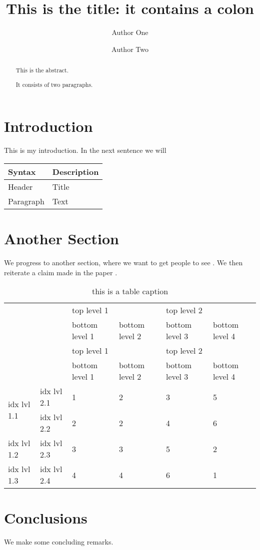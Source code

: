\documentclass[
]{article}
\title{This is the title: it contains a colon}
\author{Author One \and Author Two}
\date{}
\begin{document}
\maketitle
\begin{abstract}
This is the abstract.

It consists of two paragraphs.
\end{abstract}

\hypertarget{introduction}{%
\section{Introduction}\label{introduction}}

This is my introduction. In the next sentence we will

\begin{longtable}[]{@{}ll@{}}
\toprule
Syntax & Description \\
\midrule
\endhead
Header & Title \\
Paragraph & Text \\
\bottomrule
\end{longtable}

\hypertarget{another-section}{%
\section{Another Section}\label{another-section}}

We progress to another section, where we want to get people to see
\textcite{bhatt_linear_2006}. We then reiterate a claim made in the
paper \autocite{bhatt_linear_2006}.

\begin{longtable}[]{@{}llllll@{}}
\caption{this is a table caption}\tabularnewline
\toprule
& & \multicolumn{2}{l}{top level 1} & \multicolumn{2}{l}{top level 2} \\
& & bottom level 1 & bottom level 2 & bottom level 3 & bottom level 4 \\
\midrule
\endfirsthead
\toprule
& & \multicolumn{2}{l}{top level 1} & \multicolumn{2}{l}{top level 2} \\
& & bottom level 1 & bottom level 2 & bottom level 3 & bottom level 4 \\
\midrule
\endhead
\multirow{2}{*}{idx lvl 1.1} & idx lvl 2.1 & 1 & 2 & 3 & 5 \\
& idx lvl 2.2 & 2 & 2 & 4 & 6 \\
idx lvl 1.2 & idx lvl 2.3 & 3 & 3 & 5 & 2 \\
idx lvl 1.3 & idx lvl 2.4 & 4 & 4 & 6 & 1 \\
\bottomrule
\end{longtable}

\hypertarget{conclusions}{%
\section{Conclusions}\label{conclusions}}

We make some concluding remarks.

\printbibliography[title=References]
\end{document}
